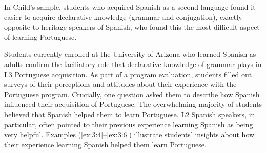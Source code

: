\documentclass[output=paper]{../langscibook}
\begin{document}




In Child’s sample, students who acquired Spanish as a second language found it easier to acquire declarative knowledge (grammar and conjugation), exactly opposite to heritage speakers of Spanish, who found this the most difficult aspect of learning Portuguese. 

Students currently enrolled at the University of Arizona who learned Spanish as adults confirm the faciliatory role that declarative knowledge of grammar plays in L3 Portuguese acquisition. As part of a program evaluation, students filled out surveys of their perceptions and attitudes about their experience with the Portuguese program. Crucially, one question asked them to describe how Spanish influenced their acquisition of Portuguese. The overwhelming majority of students believed that Spanish helped them to learn Portuguese. L2 Spanish speakers, in particular, often pointed to their previous experience learning Spanish as being very helpful. Examples (\ref{ex:3:4}--\ref{ex:3:6}) illustrate students’ insights about how their experience learning Spanish helped them learn Portuguese.
\end{document}
